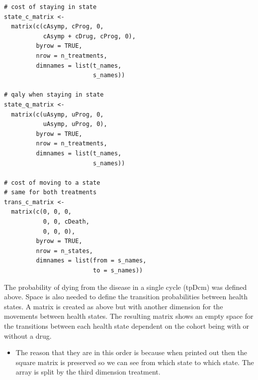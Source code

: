 \documentclass[a4paper,twoside,openany]{../svmonoBUGS}\usepackage[]{graphicx}\usepackage[]{color}
\begin{document}
\begin{verbatim}
# cost of staying in state
state_c_matrix <-
  matrix(c(cAsymp, cProg, 0,
           cAsymp + cDrug, cProg, 0),
         byrow = TRUE,
         nrow = n_treatments,
         dimnames = list(t_names,
                         s_names))

# qaly when staying in state
state_q_matrix <-
  matrix(c(uAsymp, uProg, 0,
           uAsymp, uProg, 0),
         byrow = TRUE,
         nrow = n_treatments,
         dimnames = list(t_names,
                         s_names))

# cost of moving to a state
# same for both treatments
trans_c_matrix <-
  matrix(c(0, 0, 0,
           0, 0, cDeath,
           0, 0, 0),
         byrow = TRUE,
         nrow = n_states,
         dimnames = list(from = s_names,
                         to = s_names))
\end{verbatim}

The probability of dying from the disease in a single cycle (tpDcm) was defined above. Space is also needed to define the transition probabilities between health states. A matrix is created as above but with another dimension for the movements between health states. The resulting matrix shows an empty space for the transitions between each health state dependent on the cohort being with or without a drug.

\begin{itemize}
\item The reason that they are in this order is because when printed out then the square matrix is preserved so we can see from which state to which state. The array is split by the third dimension treatment.
\end{itemize}
\end{document}
